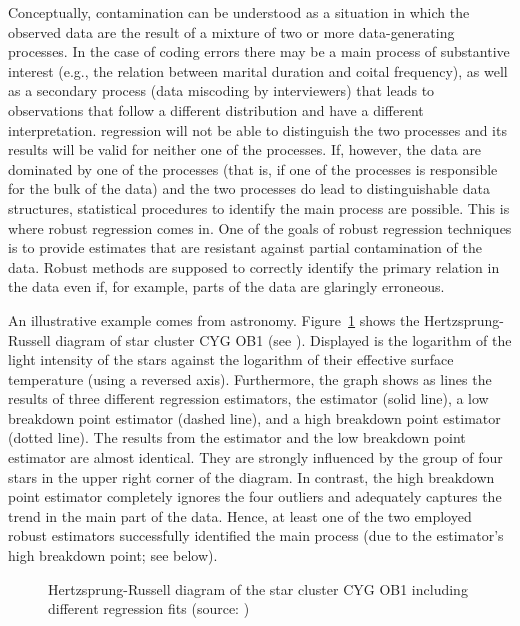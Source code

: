 Conceptually, contamination can be understood as a situation in which the
observed data are the result of a mixture of two or more data-generating
processes. In the case of coding errors there may be a main process of
substantive interest (e.g., the relation between marital duration and coital
frequency), as well as a secondary process (data miscoding by interviewers)
that leads to observations that follow a different distribution and have a
different interpretation.  regression will not be able to distinguish
the two processes and its results will be valid for neither one of the
processes. If, however, the data are dominated by one of the processes (that
is, if one of the processes is responsible for the bulk of the data) and the
two processes do lead to distinguishable data structures, statistical
procedures to identify the main process are possible. This is where robust
regression comes in. One of the goals of robust regression techniques is to
provide estimates that are resistant against partial contamination of the data.
Robust methods are supposed to correctly identify the primary relation in the
data even if, for example, parts of the data are glaringly erroneous.

An illustrative example comes from astronomy. Figure~\ref{fig:hrdiagram} shows
the Hertzsprung-Russell diagram of star cluster CYG OB1 (see
\citealt[27]{rousseeuw:leroy:1987}). Displayed is the logarithm of the light
intensity of the stars against the logarithm of their effective surface
temperature (using a reversed axis). Furthermore, the graph shows as lines the results of three
different regression estimators, the  estimator (solid line), a low
breakdown point  estimator (dashed line), and a high breakdown point
 estimator (dotted line). The results from the  estimator and
the low breakdown point  estimator are almost identical. They are
strongly influenced by the group of four stars in the upper right corner of the
diagram. In contrast, the high breakdown point  estimator completely
ignores the four outliers and adequately captures the trend in the main part of
the data. Hence, at least one of the two employed robust estimators
successfully identified the main process (due to the estimator's high breakdown
point; see below).


\begin{figure}[h!]
    \centering
    \caption{Hertzsprung-Russell diagram of the star cluster CYG OB1 including different regression fits (source: \citealp[27]{rousseeuw:leroy:1987})}
    \label{fig:hrdiagram}
\end{figure}

